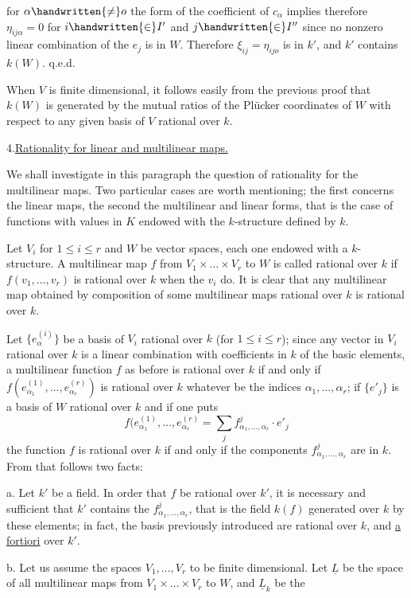 
for $\alpha\handwritten{\ne}o$ the form of the coefficient of $c_\alpha$ implies therefore $\eta_{ij\alpha}=0$ for $i\handwritten{\in}I'$ and $j\handwritten{\in}I''$ since no nonzero linear combination of the $e_j$ is in $W$. Therefore $\xi_{ij}=\eta_{ijo}$ is in $k'$, and $k'$ contains $k(W)$. \hfill q.e.d.

When $V$ is finite dimensional, it follows easily from the previous proof that $k(W)$ is generated by the mutual ratios of the Plücker coordinates of $W$ with respect to any given basis of $V$ rational over $k$.

4.\quad \uline{Rationality for linear and multilinear maps.}

We shall investigate in this paragraph the question of rationality for the multilinear maps. Two particular cases are worth mentioning; the first concerns the linear maps, the second the multilinear and linear forms, that is the case of functions with values in $K$ endowed with the $k$-structure defined by $k$.

Let $V_i$ for $1\leq i\leq r$ and $W$ be vector spaces, each one endowed with a $k$-structure. A multilinear map $f$ from $V_1\times\ldots\times V_r$ to $W$ is called rational over $k$ if $f(v_1,\ldots,v_r)$ is rational over $k$ when the $v_i$ do. It is clear that any multilinear map obtained by composition of some multilinear maps rational over $k$ is rational over $k$.

Let $\{e_\alpha^{(i)}\}$ be a basis of $V_i$ rational over $k$ (for $1\leq i\leq r$); since any vector in $V_i$ rational over $k$ is a linear combination with coefficients in $k$ of the basic elements, a multilinear function $f$ as before is rational over $k$ if and only if $f(e_{\alpha_1}^{(1)},\ldots,e_{\alpha_r}^{(r)})$ is rational over $k$ whatever be the indices $\alpha_1,\ldots,\alpha_r$; if $\{e'_j\}$ is a basis of $W$ rational over $k$ and if one puts
\[
f(e_{\alpha_1}^{(1)},\ldots,e_{\alpha_r}^{(r)}=\sum_j f^j_{\alpha_1,\ldots,\alpha_r}\cdot e'_j
\tag*{(4)}
\]
the function $f$ is rational over $k$ if and only if the components $f^j_{\alpha_1,\ldots,\alpha_r}$ are in $k$. From that follows two facts:

a. Let $k'$ be a field. In order that $f$ be rational over $k'$, it is necessary and sufficient that $k'$ contains the $f^j_{\alpha_1,\ldots,\alpha_r}$, that is the field $k(f)$ generated over $k$ by these elements; in fact, the basis previously introduced are rational over $k$, and \uline{a fortiori} over $k'$.

b. Let us assume the spaces $V_1,\ldots,V_r$ to be finite dimensional. Let $\underline{L}$ be the space of all multilinear maps from $V_1\times\ldots\times V_r$ to $W$, and $\underline{L}_k$ be the

\margin{\handwritten{\unsure{!}}}
